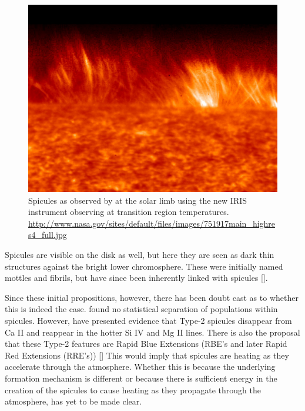 \begin{figure}
	\centering
	\includegraphics[scale=0.4]{Chapter2/Figs/spicules_at_limb}
	\caption{Spicules as observed by at the solar limb using the new IRIS instrument observing at transition region temperatures.
		\url{http://www.nasa.gov/sites/default/files/images/751917main_highres4_full.jpg}}
\end{figure}

Spicules are visible on the disk as well, but here they are seen as dark thin structures against the bright lower chromosphere.
These were initially named mottles and fibrils, but have since been inherently linked with spicules [\cite{DePontieu2007MF, Rouppe2009}].

Since these initial propositions, however, there has been doubt cast as to whether this is indeed the case. 
\cite{Zhang2012} found no statistical separation of populations within spicules.
However, \cite{Pereira2014} have presented evidence that Type-2 spicules disappear from Ca II and reappear in the hotter Si IV and Mg II lines.
There is also the proposal that these Type-2 features are Rapid Blue Extensions (RBE's and later Rapid Red Extensions (RRE's)) [\cite{Kuridze2015, Rouppe2015}]
This would imply that spicules are heating as they accelerate through the atmosphere.
Whether this is because the underlying formation mechanism is different or because there is sufficient energy in the creation of the spicules to cause heating as they propagate through the atmosphere, has yet to be made clear. 

